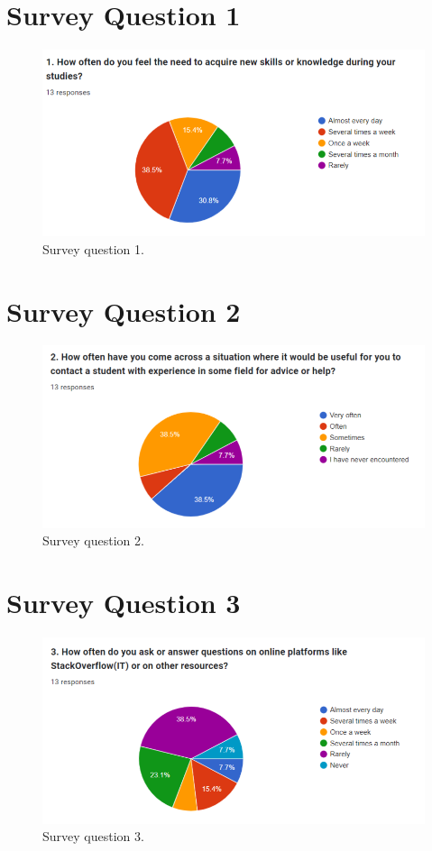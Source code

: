 \section{Survey Question 1}\label{survqa1}
\begin{figure}[H]\label{fig:survey1}
  \centering
  \includegraphics[width=0.8\linewidth]{figures/Survey question 1.png}
  \caption{Survey question 1.}
\end{figure}
\section{Survey Question 2}\label{survqa2}
\begin{figure}[H]\label{fig:survey2}
  \centering
  \includegraphics[width=0.8\linewidth]{figures/Survey question 2.png}
  \caption{Survey question 2.}
\end{figure}
\section{Survey Question 3}\label{survqa3}
\begin{figure}[H]\label{fig:survey3}
  \centering
  \includegraphics[width=0.8\linewidth]{figures/Survey question 3.png}
  \caption{Survey question 3.}
\end{figure}
